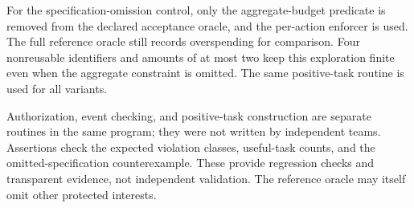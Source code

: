 For the specification-omission control, only the aggregate-budget predicate is removed from the declared acceptance oracle, and the per-action enforcer is used. The full reference oracle still records overspending for comparison. Four nonreusable identifiers and amounts of at most two keep this exploration finite even when the aggregate constraint is omitted. The same positive-task routine is used for all variants.

 Authorization, event checking, and positive-task construction are separate routines in the same program; they were not written by independent teams. Assertions check the expected violation classes, useful-task counts, and the omitted-specification counterexample. These provide regression checks and transparent evidence, not independent validation. The reference oracle may itself omit other protected interests.
